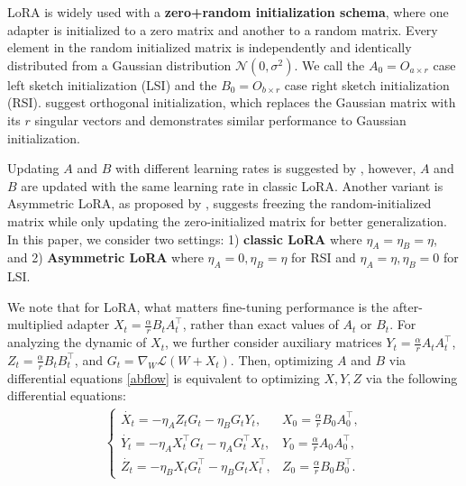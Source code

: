 LoRA is widely used with a \textbf{zero+random initialization schema}, where one adapter is initialized to a zero matrix and another to a random matrix. Every element in the random initialized matrix is independently and identically distributed from a Gaussian distribution $\mathcal{N}(0,\sigma^2)$. We call the $A_0=O_{a\times r}$ case left sketch initialization (LSI) and the $B_0=O_{b\times r}$ case right sketch initialization (RSI). \citet{zhu2024asymmetry} suggest orthogonal initialization, which replaces the Gaussian matrix with its $r$ singular vectors and demonstrates similar performance to Gaussian initialization. 

Updating $A$ and $B$ with different learning rates is suggested by \citet{hayou2024lora}, however, $A$ and $B$ are updated with the same learning rate in classic LoRA. Another variant is Asymmetric LoRA, as proposed by \citet{zhu2024asymmetry}, suggests freezing the random-initialized matrix while only updating the zero-initialized matrix for better generalization. In this paper, we consider two settings: 1) \textbf{classic LoRA} where $\eta_A=\eta_B=\eta$, and 2) \textbf{Asymmetric LoRA} where $\eta_A=0,\eta_B=\eta$ for RSI and $\eta_A=\eta,\eta_B=0$ for LSI. 

We note that for LoRA, what matters fine-tuning performance is the after-multiplied adapter $X_t=\frac{\alpha}{r} B_tA_t^\top$, rather than exact values of $A_t$ or $B_t$. For analyzing the dynamic of $X_t$, we further consider auxiliary matrices $Y_t=\frac{\alpha}{r}A_tA_t^\top $, $Z_t=\frac{\alpha}{r}B_tB_t^\top $, and $G_t=\nabla_W\mathcal{L}(W+X_t)$. Then, optimizing $A$ and $B$ via differential equations \ref{abflow} is equivalent to optimizing $X,Y,Z$ via the following differential equations:
\begin{align}
    \begin{cases}
        \dot{X_t}=-\eta_A Z_tG_t-\eta_B G_tY_t , &X_0=\frac{\alpha}{r}B_0A_0^\top,\\
        \dot{Y_t}=-\eta_A X_t^\top G_t-\eta_A G_t^\top X_t , &Y_0=\frac{\alpha}{r}A_0A_0^\top,\\
        \dot{Z_t}=-\eta_B X_tG_t^\top -\eta_B G_tX_t^\top  , &Z_0=\frac{\alpha}{r}B_0B_0^\top.
    \end{cases}
    \label{xflow}
\end{align}


